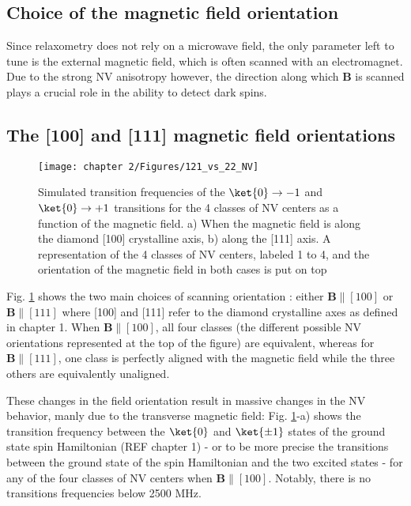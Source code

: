 \documentclass[a4paper,11pt]{report}
\begin{document}
\begin{refsection}
\section{Choice of the magnetic field orientation}

Since relaxometry does not rely on a microwave field, the only parameter left to tune is the external magnetic field, which is often scanned with an electromagnet. Due to the strong NV anisotropy however, the direction along which $\mathbf{B}$ is scanned plays a crucial role in the ability to detect dark spins.

\subsection{The [100] and [111] magnetic field orientations}
\label{sec simu}

\begin{figure}[h]
\centering
\texttt{[image: chapter 2/Figures/121\_vs\_22\_NV]}
\caption{Simulated transition frequencies of the $\ket{0} \to {-1}$ and $\ket{0} \to {+1}$ transitions for the 4 classes of NV centers as a function of the magnetic field. a) When the magnetic field is along the diamond [100] crystalline axis, b) along the [111] axis. A representation of the 4 classes of NV centers, labeled 1 to 4, and the orientation of the magnetic field in both cases is put on top}
\label{121 vs 22 NV}
\end{figure}

Fig. \ref{121 vs 22 NV} shows the two main choices of scanning orientation : either $\mathbf{B} \parallel [100]$ or 
$\mathbf{B} \parallel [111]$ where [100] and [111] refer to the diamond crystalline axes as defined in chapter 1. When $\mathbf{B} \parallel [100]$, all four classes (the different possible NV orientations represented at the top of the figure) are equivalent, whereas for $\mathbf{B} \parallel [111]$, one class is perfectly aligned with the magnetic field while the three others are equivalently unaligned. 

These changes in the field orientation result in massive changes in the NV behavior, manly due to the transverse magnetic field: Fig. \ref{121 vs 22 NV}-a) shows the transition frequency between the $\ket{0}$ and $\ket{\pm 1}$ states of the ground state spin Hamiltonian (REF chapter 1) - or to be more precise the transitions between the ground state of the spin Hamiltonian and the two excited states - for any of the four classes of NV centers when $\mathbf{B} \parallel [100]$. Notably, there is no transitions frequencies below 2500 MHz. 


\end{refsection}
\end{document}
